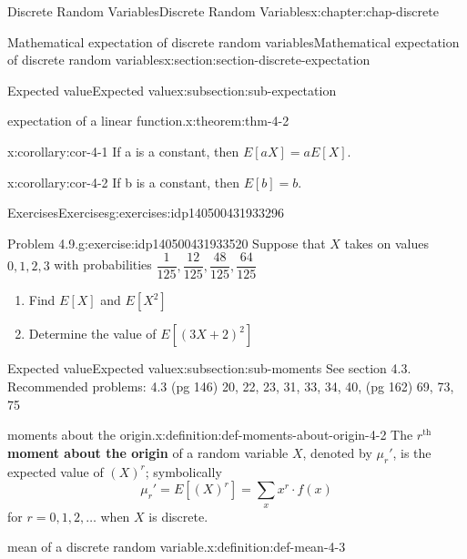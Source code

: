 \documentclass[oneside,10pt,]{book}
\newcommand{\terminology}[1]{\textbf{#1}}
\begin{document}
\begin{chapterptx}{Discrete Random Variables}{}{Discrete Random Variables}{}{}{x:chapter:chap-discrete}
\begin{sectionptx}{Mathematical expectation of discrete random variables}{}{Mathematical expectation of discrete random variables}{}{}{x:section:section-discrete-expectation}
\begin{subsectionptx}{Expected value}{}{Expected value}{}{}{x:subsection:sub-expectation}
\begin{theorem}{expectation of a linear function.}{}{x:theorem:thm-4-2}
\end{theorem}
\begin{corollary}{}{}{x:corollary:cor-4-1}%
If a is a constant, then \(\displaystyle E[aX] = aE[X]\).%
\end{corollary}
\begin{corollary}{}{}{x:corollary:cor-4-2}%
If b is a constant, then \(\displaystyle E[b] = b\).%
\end{corollary}
\end{subsectionptx}
%
%
\typeout{************************************************}
\typeout{************************************************}
%
\begin{exercises-subsection}{Exercises}{}{Exercises}{}{}{g:exercises:idp140500431933296}
\begin{divisionexercise}{1}{Problem 4.9.}{}{g:exercise:idp140500431933520}%
Suppose that \(X\) takes on values \(0, 1, 2, 3\) with probabilities \(\dfrac{1}{125}, \dfrac{12}{125}, \dfrac{48}{125},
\dfrac{64}{125}\)%
\begin{enumerate}[label=(\alph*)]
\item{}Find \(E[X]\) and \(E[X^2]\)%
\item{}Determine the value of \(E[(3X + 2)^2]\)%
\end{enumerate}
%
\end{divisionexercise}%
\end{exercises-subsection}
%
%
\typeout{************************************************}
\typeout{************************************************}
%
\begin{subsectionptx}{Expected value}{}{Expected value}{}{}{x:subsection:sub-moments}
See section 4.3. Recommended problems: 4.3 (pg 146) 20, 22, 23, 31, 33, 34, 40, (pg 162) 69, 73, 75%
\begin{definition}{moments about the origin.}{x:definition:def-moments-about-origin-4-2}%
The \(\displaystyle r^\text{th}\) \terminology{moment about the origin} of a random variable \(X\), denoted by \(\displaystyle \mu_r'\), is the expected value of \(\displaystyle
(X)^r\); symbolically%
\begin{equation*}
\mu_r'=E[(X)^r] = \sum_x x^r\cdot f(x)
\end{equation*}
for \(\displaystyle r =
0,1,2, \dots\) when \(X\) is discrete.%
\end{definition}
\begin{definition}{mean of a discrete random variable.}{x:definition:def-mean-4-3}%

\end{definition}
\end{subsectionptx}
\end{sectionptx}
\end{chapterptx}
\end{document}
